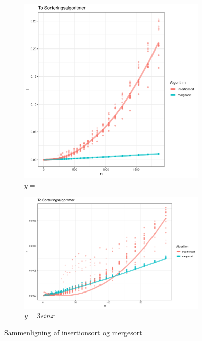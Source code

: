 \begin{figure} \centering
	\begin{subfigure}[b]{0.45\textwidth}
		\centering
		\includegraphics[width=\textwidth]{../img/toAlgoritmer.png}
		\caption{$y=$}
		\label{fig:regressioner}
	\end{subfigure}
	\hfill
	\begin{subfigure}[b]{0.45\textwidth}
		\centering
		\includegraphics[width=\textwidth]{../img/toAlgoritmerZoomed}
		\caption{$y=3sinx$}
		\label{fig:residualplot}
	\end{subfigure}
	\caption{Sammenligning af insertionsort og mergesort}
	\label{fig:plot - to algoritmer}
\end{figure}
